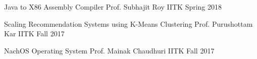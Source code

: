
\begin{cvhonors}

	\cvhonor
	{Java to X86 Assembly Compiler}
	{Prof. Subhajit Roy}
	{IITK}
	{Spring 2018}

	\cvhonor
	{Scaling Recommendation Systems using K-Means Clustering}
	{Prof. Purushottam Kar}
	{IITK}
	{Fall 2017}

	\cvhonor
	{NachOS Operating System}
	{Prof. Mainak Chaudhuri}
	{IITK}
	{Fall 2017}

\end{cvhonors}
